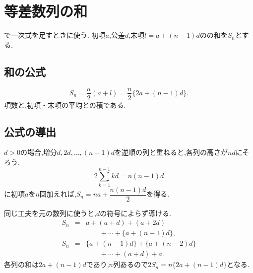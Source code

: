 
\section{等差数列の和}\label{節：等差数列とその総和の導出}
  で一次式を足すときに使う.
  初項$a$,公差$d$,末項$l=a+(n-1)d$のの和を$S_n$とする.

  \subsection{和の公式}\label{節：等差数列とその総和の導出：総和の公式}
    \[
      S_n=\frac n2(a+l)=\frac n2\{2a+(n-1)d\}.
    \]
    項数と,初項・末項の平均との積である.

  \subsection{公式の導出}\label{節：等差数列とその総和の導出：公式の導出}
    $d>0$の場合,増分$d,2d,\ldots,(n-1)d$を逆順の列と重ねると,各列の高さが$nd$にそろう.
    \[
      2\sum_{k=1}^{n-1}kd=n(n-1)d
    \]
    に初項$a$を$n$回加えれば,$S_n=na+\dfrac{n(n-1)d}{2}$を得る.
    \BookFigArithmeticSum

    同じ工夫を元の数列に使うと,$d$の符号によらず導ける.
    \[
      \begin{array}{rcl}
        S_n&=&a+(a+d)+(a+2d)\\
           &&\qquad+\cdots+\{a+(n-1)d\},\\
        S_n&=&\{a+(n-1)d\}+\{a+(n-2)d\}\\
           &&\qquad+\cdots+(a+d)+a.
      \end{array}
    \]
    各列の和は$2a+(n-1)d$であり,$n$列あるので$2S_n=n\{2a+(n-1)d\}$となる.
